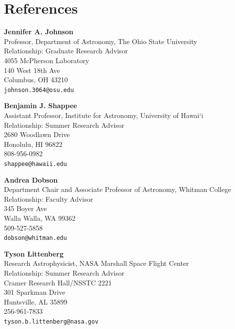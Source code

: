 \section*{References}

\textbf{Jennifer A. Johnson} \\
Professor, Department of Astronomy, The Ohio State University \\
Relationship: Graduate Research Advisor \\
4055 McPherson Laboratory \\
140 West 18th Ave \\
Columbus, OH 43210 \\
\texttt{johnson.3064@osu.edu}
\vspace{12pt}

\textbf{Benjamin J. Shappee} \\
Assistant Professor, Institute for Astronomy, University of Hawai`i \\
Relationship: Summer Research Advisor \\
2680 Woodlawn Drive \\
Honolulu, HI 96822 \\
808-956-0982 \\
\texttt{shappee@hawaii.edu}
\vspace{12pt}

\textbf{Andrea Dobson} \\
Department Chair and Associate Professor of Astronomy, Whitman College \\
Relationship: Faculty Advisor \\
345 Boyer Ave \\
Walla Walla, WA 99362 \\
509-527-5858 \\
\texttt{dobson@whitman.edu}
\vspace{12pt}

\textbf{Tyson Littenberg} \\
Research Astrophysicist, NASA Marshall Space Flight Center \\
Relationship: Summer Research Advisor \\
Cramer Research Hall/NSSTC 2221 \\
301 Sparkman Drive \\
Huntsville, AL 35899 \\
256-961-7833 \\
\texttt{tyson.b.littenberg@nasa.gov}
\vspace{12pt}